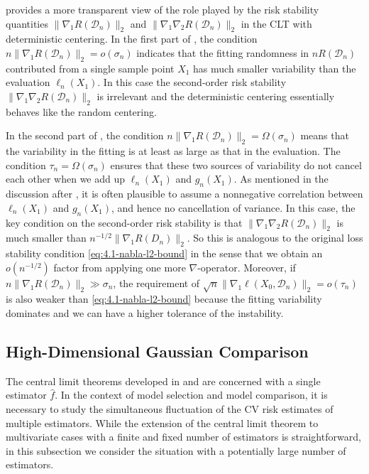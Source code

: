 \documentclass[11pt]{article}
\theoremstyle{plain}
\newcommand{\D}{{\mathcal{D}}}
\begin{document}
 provides a more transparent view of the role played by the risk stability quantities $\|\nabla_1 R(\D_n)\|_2$ and $\|\nabla_1\nabla_2 R(\D_n)\|_2$ in the CLT with deterministic centering.  In the first part of , the condition $n\|\nabla_1 R(\D_n)\|_2=o(\sigma_n)$ indicates that the fitting randomness in $nR(\D_n)$ contributed from a single sample point $X_1$ has much smaller variability than the evaluation $\ell_n(X_1)$.  In this case the second-order risk stability $\|\nabla_1\nabla_2 R(\D_n)\|_2$ is irrelevant and the deterministic centering essentially behaves like the random centering.

In the second part of , the condition $n\|\nabla_1 R(\D_n)\|_2=\Omega(\sigma_n)$ means that the variability in the fitting is at least as large as that in the evaluation.  The condition $\tau_n=\Omega(\sigma_n)$ ensures that these two sources of variability do not cancel each other when we add up $\ell_n(X_1)$ and $g_n(X_1)$. As mentioned in the discussion after , it is often plausible to assume a nonnegative correlation between $\ell_n(X_1)$ and $g_n(X_1)$, and hence no cancellation of variance.  In this case, the key condition on the second-order risk stability is that $\|\nabla_1\nabla_2 R(\D_n)\|_2$ is much smaller than $n^{-1/2}\|\nabla_1 R(D_n)\|_2$.  So this is analogous to the original loss stability condition \eqref{eq:4.1-nabla-l2-bound} in the sense that we obtain an $o(n^{-1/2})$ factor from applying one more $\nabla$-operator.  Moreover, if $n\|\nabla_1 R(\D_n)\|_2\gg \sigma_n$, the requirement of $\sqrt{n}\|\nabla_1 \ell(X_0,\D_n)\|_2=o(\tau_n)$ is also weaker than \eqref{eq:4.1-nabla-l2-bound} because the fitting variability dominates and we can have a higher tolerance of the instability.


\subsection{High-Dimensional Gaussian Comparison}\label{subsec:4.3-hd-clt}
The central limit theorems developed in  and  are concerned with a single estimator $\hat f$.  In the context of model selection and model comparison, it is necessary to study the simultaneous fluctuation of the CV risk estimates of multiple estimators.  While the extension of the central limit theorem to multivariate cases with a finite and fixed number of estimators is straightforward, in this subsection we consider the situation with a potentially large number of estimators.
\end{document}
